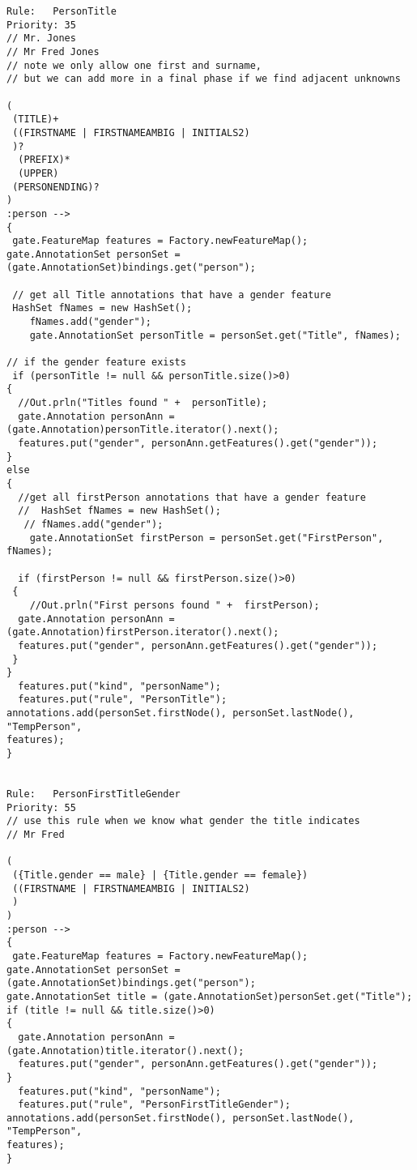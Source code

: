 \begin{verbatim}
Rule:	PersonTitle
Priority: 35
// Mr. Jones
// Mr Fred Jones
// note we only allow one first and surname, 
// but we can add more in a final phase if we find adjacent unknowns
 
(
 (TITLE)+
 ((FIRSTNAME | FIRSTNAMEAMBIG | INITIALS2)
 )?
  (PREFIX)* 
  (UPPER)
 (PERSONENDING)?
)
:person -->
{
 gate.FeatureMap features = Factory.newFeatureMap();
gate.AnnotationSet personSet = (gate.AnnotationSet)bindings.get("person");
  
 // get all Title annotations that have a gender feature
 HashSet fNames = new HashSet();
    fNames.add("gender");
    gate.AnnotationSet personTitle = personSet.get("Title", fNames);

// if the gender feature exists
 if (personTitle != null && personTitle.size()>0)
{
  //Out.prln("Titles found " +  personTitle);
  gate.Annotation personAnn = (gate.Annotation)personTitle.iterator().next();
  features.put("gender", personAnn.getFeatures().get("gender"));
}
else
{
  //get all firstPerson annotations that have a gender feature
  //  HashSet fNames = new HashSet();
   // fNames.add("gender");
    gate.AnnotationSet firstPerson = personSet.get("FirstPerson", fNames);

  if (firstPerson != null && firstPerson.size()>0)
 {
    //Out.prln("First persons found " +  firstPerson);
  gate.Annotation personAnn = (gate.Annotation)firstPerson.iterator().next();
  features.put("gender", personAnn.getFeatures().get("gender"));
 }
}
  features.put("kind", "personName");
  features.put("rule", "PersonTitle");
annotations.add(personSet.firstNode(), personSet.lastNode(), "TempPerson",
features);
}


Rule:	PersonFirstTitleGender
Priority: 55
// use this rule when we know what gender the title indicates
// Mr Fred

(
 ({Title.gender == male} | {Title.gender == female})
 ((FIRSTNAME | FIRSTNAMEAMBIG | INITIALS2)
 )
)
:person -->
{
 gate.FeatureMap features = Factory.newFeatureMap();
gate.AnnotationSet personSet = (gate.AnnotationSet)bindings.get("person");
gate.AnnotationSet title = (gate.AnnotationSet)personSet.get("Title");
if (title != null && title.size()>0)
{
  gate.Annotation personAnn = (gate.Annotation)title.iterator().next();
  features.put("gender", personAnn.getFeatures().get("gender"));
}
  features.put("kind", "personName");
  features.put("rule", "PersonFirstTitleGender");
annotations.add(personSet.firstNode(), personSet.lastNode(), "TempPerson",
features);
}



\end{verbatim}
